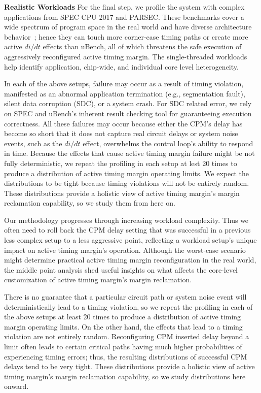 \textbf{Realistic Workloads} %
For the final step, we profile the system with complex applications from SPEC CPU 2017 and PARSEC. These benchmarks cover a wide spectrum of program space in the real world and have diverse architecture behavior~\cite{song2018spec,bienia2008parsecsplash}; hence they can touch more corner-case timing paths or create more active $di/dt$ effects than uBench, all of which threatens the safe execution of aggressively reconfigured active timing margin. {The single-threaded workloads help identify application, chip-wide, and individual core level heterogeneity.}

In each of the above setups, failure may occur as a result of timing violation, manifested as an abnormal application termination (e.g., segmentation fault), silent data corruption (SDC), or a system crash. For SDC related error, we rely on SPEC and uBench's inherent result checking tool for guaranteeing execution correctness. All these failures may occur because either the CPM's delay has become so short that it does not capture real circuit delays or system noise events, such as the $di/dt$ effect, overwhelms the control loop's ability to respond in time. Because the effects that cause active timing margin failure might be not fully deterministic, we repeat the profiling in each setup at lest 20 times to produce a distribution of active timing margin operating limits. We expect the distributions to be tight because timing violations will not be entirely random. These distributions provide a holistic view of active timing margin's margin reclamation capability, so we study them from here on.

Our methodology progresses through increasing workload complexity. Thus we often need to roll back the CPM delay setting that was successful in a previous less complex setup to a less aggressive point, reflecting a workload setup's unique impact on active timing margin's operation. Although the worst-case scenario might determine practical active timing margin reconfiguration in the real world, the middle point analysis shed useful insights on what affects the core-level customization of active timing margin's margin reclamation.

There is no guarantee that a particular circuit path or system noise event will deterministically lead to a timing violation, so we repeat the profiling in each of the above setups at least 20 times to produce a distribution of active timing margin operating limits. On the other hand, the effects that lead to a timing violation are not entirely random. Reconfiguring CPM inserted delay beyond a limit often leads to certain critical paths having much higher probabilities of experiencing timing errors; thus, the resulting distributions of successful CPM delays tend to be very tight. These distributions provide a holistic view of active timing margin's margin reclamation capability, so we study distributions here onward.

